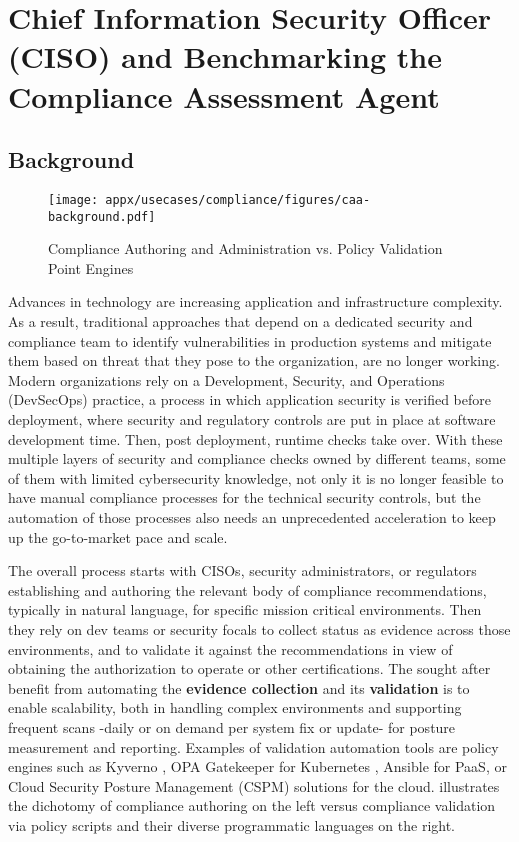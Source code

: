\section{Chief Information Security Officer (CISO) and Benchmarking the Compliance Assessment Agent}
\label{appx:ciso}
\subsection{Background}

\begin{figure*}[t!]
    \centering
    \texttt{[image: appx/usecases/compliance/figures/caa-background.pdf]}
    \caption{Compliance Authoring and Administration vs. Policy Validation Point Engines}
    \label{fig:CAA-background}
\end{figure*}
Advances in technology are increasing application and infrastructure complexity. As a result, traditional approaches that depend on a dedicated security and compliance team to identify vulnerabilities in production systems and mitigate them based on threat that they pose to the organization, are no longer working. Modern organizations rely on a Development, Security, and Operations (DevSecOps) practice, a process in which application security is verified before deployment, where security and regulatory controls are put in place at software development time. Then, post deployment, runtime checks take over. With these multiple layers of security and compliance checks owned by different teams, some of them with limited cybersecurity knowledge, not only it is no longer feasible to have manual compliance processes for the technical security controls, but the automation of those processes also needs an unprecedented acceleration to keep up the go-to-market pace and scale.

The overall process starts with CISOs, security administrators, or regulators establishing and authoring the relevant body of compliance recommendations, typically in natural language, for specific mission critical environments. Then they rely on dev teams or security focals to collect status as evidence across those environments, and to validate it against the recommendations in view of obtaining the authorization to operate or other certifications. The sought after benefit from automating the \textbf{evidence collection} and its \textbf{validation} is to enable scalability, both in handling complex environments and supporting frequent scans -daily or on demand per system fix or update-  for posture measurement and reporting. Examples of validation automation tools are policy engines such as Kyverno \cite{Intro:Kyverno}, OPA Gatekeeper \cite{Intro:GateKeeper} for Kubernetes , Ansible \cite{Intro:Ansible} for PaaS, or Cloud Security Posture Management (CSPM) solutions for the cloud. 
 illustrates the dichotomy of compliance authoring on the left versus compliance validation via policy scripts and their diverse programmatic languages on the right. 

